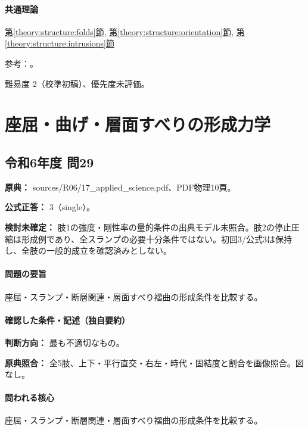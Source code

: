 \paragraph{共通理論} \hyperref[theory:structure:folds]{第\ref*{theory:structure:folds}節}, \hyperref[theory:structure:orientation]{第\ref*{theory:structure:orientation}節}, \hyperref[theory:structure:intrusions]{第\ref*{theory:structure:intrusions}節}

\par 参考：\cite{str_intrusion,str_fold}。

\par 難易度 2（校準初稿）、優先度未評価。

\section{座屈・曲げ・層面すべりの形成力学}

\subsection{令和6年度 問29}
\label{q:r06-reg-applied-29}

\noindent\textbf{原典：} sources/R06/17\_applied\_science.pdf、PDF物理10頁。

\textbf{公式正答：} 3（single）。

\par\textbf{検討未確定：} 肢1の強度・剛性率の量的条件の出典モデル未照合。肢2の停止圧縮は形成例であり、全スランプの必要十分条件ではない。初回3/公式3は保持し、全肢の一般的成立を確認済みとしない。

\paragraph{問題の要旨} 座屈・スランプ・断層関連・層面すべり褶曲の形成条件を比較する。

\paragraph{確認した条件・記述（独自要約）}\mbox{}\par

\noindent\textbf{判断方向：} 最も不適切なもの。\par

\noindent\textbf{原典照合：} 全5肢、上下・平行直交・右左・時代・固結度と割合を画像照合。図なし。\par

\paragraph{問われる核心} 座屈・スランプ・断層関連・層面すべり褶曲の形成条件を比較する。


